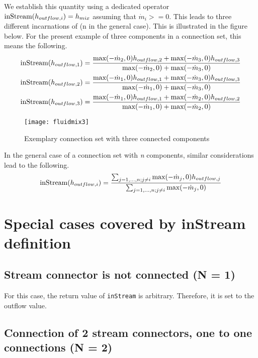We establish this quantity using a dedicated operator $\text{\lstinline!inStream!}(h_{outflow,i})=h_{mix}$ assuming that $\dot{m}_{i} >= 0$. This leads to
three different incarnations of (n in the general case). This is
illustrated in the figure below. For the present example of three
components in a connection set, this means the following.
\begin{align*}
\text{\lstinline!inStream!}(h_{outflow,1}) &= \frac{\text{max}(-\dot{m}_2,0)h_{outflow,2}+\text{max}(-\dot{m}_3,0)h_{outflow,3}}{\text{max}(-\dot{m}_2,0)+\text{max}(-\dot{m}_3,0)}\\
\text{\lstinline!inStream!}(h_{outflow,2}) &= \frac{\text{max}(-\dot{m}_1,0)h_{outflow,1}+\text{max}(-\dot{m}_3,0)h_{outflow,3}}{\text{max}(-\dot{m}_1,0)+\text{max}(-\dot{m}_3,0)}\\
\text{\lstinline!inStream!}(h_{outflow,3}) &= \frac{\text{max}(-\dot{m}_1,0)h_{outflow,1}+\text{max}(-\dot{m}_2,0)h_{outflow,2}}{\text{max}(-\dot{m}_1,0)+\text{max}(-\dot{m}_2,0)}
\end{align*}
\begin{figure}[H]
\caption{Exemplary connection set with three connected components}
\begin{center}
\texttt{[image: fluidmix3]}
\end{center}
\end{figure}

In the general case of a connection set with \emph{n} components,
similar considerations lead to the following.
\begin{equation*}
\text{\lstinline!inStream!}(h_{outflow,i})=\frac{\sum_{j=1,...,n;j\neq i}\text{max}(-\dot{m}_j,0)h_{outflow,j}}{\sum_{j=1,...,n;j\neq i}\text{max}(-\dot{m}_j,0)}
\end{equation*}

\section{Special cases covered by inStream definition}\label{special-cases-covered-by-the-instream-operator-definition}
\subsection{Stream connector is not connected (N = 1)}\label{stream-connector-is-not-connected-n-1}
For this case, the return value of \lstinline!inStream! is arbitrary.
Therefore, it is set to the outflow value.

\subsection{Connection of 2 stream connectors, one to one connections (N = 2)}\label{connection-of-2-stream-connectors-one-to-one-connections-n-2}

